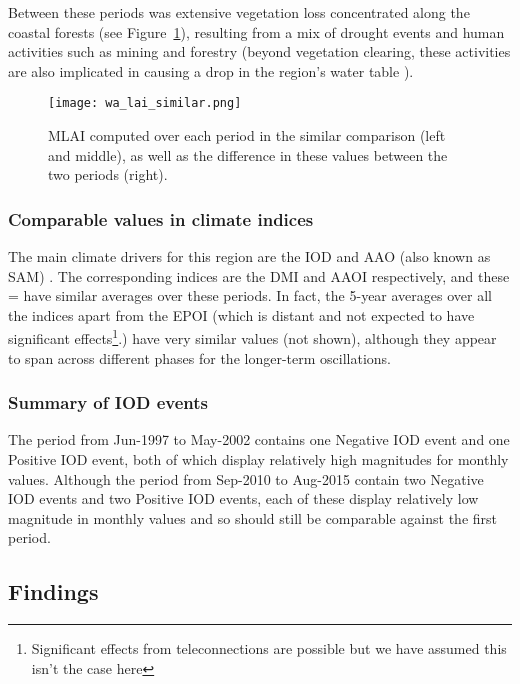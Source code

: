 Between these periods was extensive vegetation loss concentrated along the coastal forests (see Figure~\ref{fig:wa_lai_similar}), resulting from a mix of drought events and human activities such as mining and forestry (beyond vegetation clearing, these activities are also implicated in causing a drop in the region's water table \citep{gordon2003, bauxite_hydro, johnson2003}).

\begin{figure}[!ht]
	\centering
	\texttt{[image: wa\_lai\_similar.png]}
	\caption[MLAI similar comparison for WA focus region]{\ac{MLAI} computed over each period in the similar comparison (left and middle), as well as the difference in these values between the two periods (right).}
	\label{fig:wa_lai_similar}
\end{figure}

\subsubsection{Comparable values in climate indices}

The main climate drivers for this region are the \ac{IOD} and \ac{AAO} (also known as \ac{SAM}) \citep{wa_drivers}. The corresponding indices are the \ac{DMI} and \ac{AAOI} respectively, and these = have similar averages over these periods. In fact, the 5-year averages over all the indices apart from the \ac{EPOI} (which is distant and not expected to have significant effects\footnote{Significant effects from teleconnections are possible but we have assumed this isn't the case here}.) have very similar values (not shown), although they appear to span across different phases for the longer-term oscillations.

\subsubsection{Summary of IOD events}

The period from Jun-1997 to May-2002 contains one Negative \ac{IOD} event and one Positive \ac{IOD} event, both of which display relatively high magnitudes for monthly values. Although the period from Sep-2010 to Aug-2015 contain two Negative \ac{IOD} events and two Positive \ac{IOD} events, each of these display relatively low magnitude in monthly values and so should still be comparable against the first period.

\subsection{Findings}
\label{ssec:similar_find}

